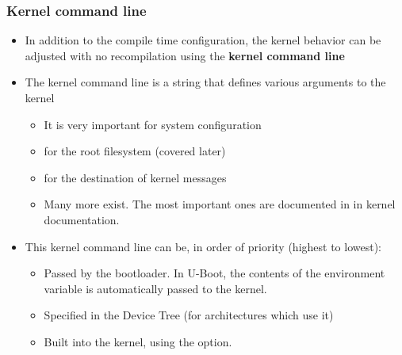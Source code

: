 \begin{frame}
  \frametitle{Kernel command line}
  \begin{itemize}
  \item In addition to the compile time configuration, the kernel
    behavior can be adjusted with no recompilation using the {\bf
      kernel command line}
  \item The kernel command line is a string that defines various
    arguments to the kernel
    \begin{itemize}
    \item It is very important for system configuration
    \item {} for the root filesystem (covered later)
    \item {} for the destination of kernel messages
    \item Many more exist. The most important ones are documented
          in  in kernel
          documentation.
    \end{itemize}
  \item This kernel command line can be, in order of priority (highest
    to lowest):
    \begin{itemize}
    \item Passed by the bootloader. In U-Boot, the contents of the
       environment variable is automatically passed to the
      kernel.
    \item Specified in the Device Tree (for architectures which use it)
    \item Built into the kernel, using the  option.
    \end{itemize}
  \end{itemize}
\end{frame}
